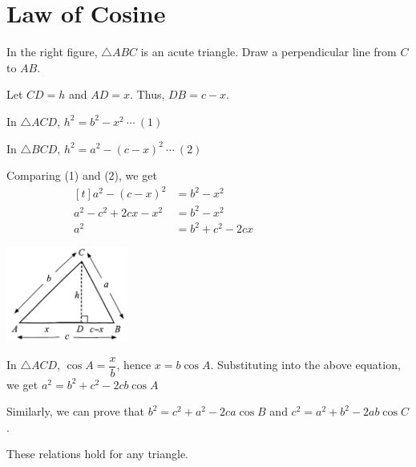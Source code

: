 \documentclass{report}
\begin{document}
    \section{Law of Cosine}

    \vspace{-1em}
    \begin{vwcol}[widths={0.6,0.4}, sep=8mm, rule=0pt]
        In the right figure, $\triangle ABC$ is an acute triangle. Draw a perpendicular line from $C$ to $AB$.
    
        \noindent Let $CD = h$ and $AD = x$. Thus, $DB = c - x$. 

        \noindent In $\triangle ACD$, $h^2 = b^2 - x^2\ \cdots\ (1)$
        
        \noindent In $\triangle BCD$, $h^2 = a^2 - (c - x)^2\ \cdots\ (2)$

        \noindent Comparing (1) and (2), we get
        \vspace{-0.5em}
        $$\begin{aligned}[t]
            a^2 - (c - x)^2 &= b^2 - x^2 &&&&&&&&&& \\
                a^2 - c^2 + 2cx - x^2 &= b^2 - x^2 \\
                a^2 &= b^2 + c^2 - 2cx
        \end{aligned}$$

        \includegraphics[width=0.3\textwidth]{assets/10-20.jpg}
    \end{vwcol}
    \vspace{-3em}

    \noindent In $\triangle ACD$, $\cos A = \dfrac{x}{b}$, hence $x = b \cos A$. Substituting into the above equation, we get
    $
    a^2 = b^2 + c^2 - 2cb \cos A
    $

    \vspace{-1em}
    \noindent Similarly, we can prove that $b^2 = c^2 + a^2 - 2ca \cos B$ and $c^2 = a^2 + b^2 - 2ab \cos C$. 
    
    \noindent These relations hold for any triangle.
    
\end{document}
